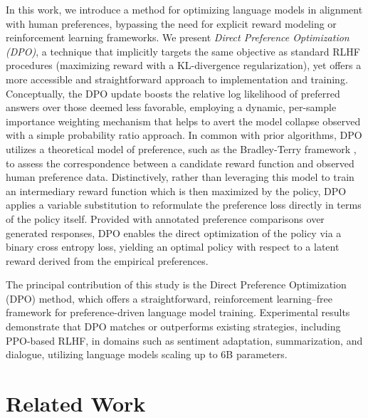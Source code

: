 In this work, we introduce a method for optimizing language models in alignment with human preferences, bypassing the need for explicit reward modeling or reinforcement learning frameworks. We present \textit{{Direct Preference Optimization} (DPO)}, a technique that implicitly targets the same objective as standard RLHF procedures (maximizing reward with a KL-divergence regularization), yet offers a more accessible and straightforward approach to implementation and training. Conceptually, the DPO update boosts the relative log likelihood of preferred answers over those deemed less favorable, employing a dynamic, per-sample importance weighting mechanism that helps to avert the model collapse observed with a simple probability ratio approach. In common with prior algorithms, DPO utilizes a theoretical model of preference, such as the Bradley-Terry framework \cite{bradley1952rankanalysis}, to assess the correspondence between a candidate reward function and observed human preference data. Distinctively, rather than leveraging this model to train an intermediary reward function which is then maximized by the policy, DPO applies a variable substitution to reformulate the preference loss directly in terms of the policy itself. Provided with annotated preference comparisons over generated responses, DPO enables the direct optimization of the policy via a binary cross entropy loss, yielding an optimal policy with respect to a latent reward derived from the empirical preferences.

The principal contribution of this study is the Direct Preference Optimization (DPO) method, which offers a straightforward, reinforcement learning–free framework for preference-driven language model training. Experimental results demonstrate that DPO matches or outperforms existing strategies, including PPO-based RLHF, in domains such as sentiment adaptation, summarization, and dialogue, utilizing language models scaling up to 6B parameters.

\section{Related Work}

